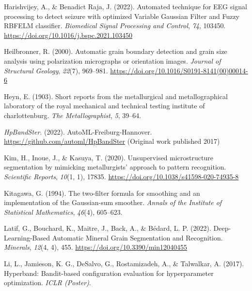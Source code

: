 \documentclass[
  12pt,
  openany]{book}
\newlength{\cslhangindent}
\newlength{\cslentryspacingunit} %
\newenvironment{CSLReferences}[2] %
 {%
  \setlength{\parindent}{0pt}
  \ifodd #1
  \let\oldpar\par
  \def\par{\hangindent=\cslhangindent\oldpar}
  \fi
  \setlength{\parskip}{#2\cslentryspacingunit}
 }%
 {}
\begin{document}
\begin{CSLReferences}{1}{0}
\leavevmode{}%
Harishvijey, A., \& Benadict Raja, J. (2022). Automated technique for {EEG} signal processing to detect seizure with optimized {Variable Gaussian Filter} and {Fuzzy RBFELM} classifier. \emph{Biomedical Signal Processing and Control}, \emph{74}, 103450. \url{https://doi.org/10.1016/j.bspc.2021.103450}

\leavevmode{}%
Heilbronner, R. (2000). Automatic grain boundary detection and grain size analysis using polarization micrographs or orientation images. \emph{Journal of Structural Geology}, \emph{22}(7), 969--981. \url{https://doi.org/10.1016/S0191-8141(00)00014-6}

\leavevmode{}%
Heyn, E. (1903). Short reports from the metallurgical and metallographical laboratory of the royal mechanical and technical testing institute of charlottenburg. \emph{The Metallographist}, \emph{5}, 39--64.

\leavevmode{}%
\emph{{HpBandSter}}. (2022). {AutoML-Freiburg-Hannover}. \url{https://github.com/automl/HpBandSter} (Original work published 2017)

\leavevmode{}%
Kim, H., Inoue, J., \& Kasuya, T. (2020). Unsupervised microstructure segmentation by mimicking metallurgists' approach to pattern recognition. \emph{Scientific Reports}, \emph{10}(1, 1), 17835. \url{https://doi.org/10.1038/s41598-020-74935-8}

\leavevmode{}%
Kitagawa, G. (1994). The two-filter formula for smoothing and an implementation of the {Gaussian-sum} smoother. \emph{Annals of the Institute of Statistical Mathematics}, \emph{46}(4), 605--623.

\leavevmode{}%
Latif, G., Bouchard, K., Maitre, J., Back, A., \& Bédard, L. P. (2022). Deep-{Learning-Based Automatic Mineral Grain Segmentation} and {Recognition}. \emph{Minerals}, \emph{12}(4, 4), 455. \url{https://doi.org/10.3390/min12040455}

\leavevmode{}%
Li, L., Jamieson, K. G., DeSalvo, G., Rostamizadeh, A., \& Talwalkar, A. (2017). Hyperband: {Bandit-based} configuration evaluation for hyperparameter optimization. \emph{{ICLR} ({Poster})}.


\end{CSLReferences}
\end{document}
